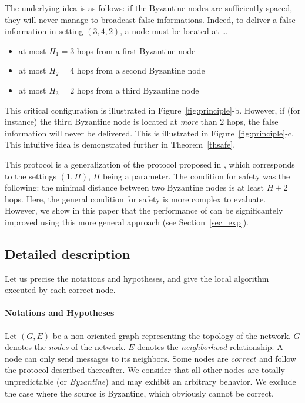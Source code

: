 \documentclass[a4paper,11pt]{article}
\begin{document}
The underlying idea is as follows: if the Byzantine nodes are sufficiently
spaced, they will never manage to broadcast false informations. Indeed, to deliver a false information in setting $(3,4,2)$, a node must be located at \dots

\begin{itemize}
\item at most $H_1 = 3$ hops from a first Byzantine node
\item at most $H_2 = 4$ hops from a second Byzantine node
\item at most $H_3 = 2$ hops from a third Byzantine node
\end{itemize}

This critical configuration is illustrated in Figure~\ref{fig:principle}-b. However, if (for instance) the third Byzantine node is located at \emph{more} than $2$ hops, the false information will never be delivered. This is illustrated in Figure~\ref{fig:principle}-c. This intuitive idea is demonstrated further in Theorem~\ref{thsafe}.

This protocol is a generalization of the protocol proposed in \cite{Trig}, which corresponds to the settings $(1,H)$, $H$ being a parameter. The condition for safety was the following: the minimal distance between two Byzantine nodes is at least $H+2$ hops. Here, the general condition for safety is more complex to evaluate. However, we show in this paper that the performance of \cite{Trig} can be significantely improved using this more general approach (see Section~\ref{sec_exp}).

\subsection{Detailed description}

Let us precise the notations and hypotheses, and give the local algorithm executed by each correct node.

\paragraph{Notations and Hypotheses}

Let $(G,E)$ be a non-oriented graph representing the topology of the network. $G$ denotes the \emph{nodes} of the network. $E$ denotes the \emph{neighborhood} relationship. A node can only send messages to its neighbors. Some nodes are $correct$ and follow the protocol described thereafter. We consider that all other nodes are totally unpredictable (or \emph{Byzantine}) and may exhibit an arbitrary behavior.
We exclude the case where the source is Byzantine, which obviously cannot be correct.
\end{document}

